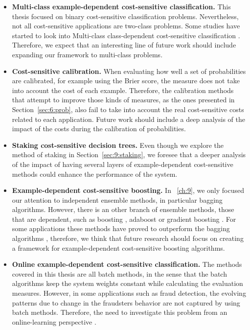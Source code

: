 \begin{itemize}
 \item \textbf{Multi-class example-dependent cost-sensitive classification.} This thesis  
focused on binary cost-sensitive classification problems. Nevertheless, not all 
 cost-sensitive applications are two-class problems. Some studies have started to 
look into Multi-class class-dependent cost-sensitive classification \citep{Zhou2010}. Therefore, we 
expect that an interesting line of future work should include expanding our framework to 
multi-class problems.

 \item \textbf{Cost-sensitive calibration.} When evaluating how well a set of probabilities are 
calibrated, for example using the Brier score, the measure does not take into account the cost of 
each example. Therefore, the calibration methods that attempt to improve those kinds of measures, as 
the ones presented in Section~\ref{sec:6:prob}, also fail to take into account the real 
cost-sensitive costs related to each application. Future work should include a deep analysis of the 
impact of the costs during the calibration of probabilities.

  \item \textbf{Staking cost-sensitive decision trees.} Even though we explore the method of 
staking in Section~\ref{sec:9:staking}, we foresee that a deeper analysis of the impact of having 
several layers of example-dependent cost-sensitive methods could enhance the performance of the 
system.

  \item \textbf{Example-dependent cost-sensitive boosting.} In \chaptername{~\ref{ch:9}}, we 
only focused our attention to independent ensemble methods, in particular bagging algorithms. 
However, there is an other branch of ensemble methods, those that are dependent, such as 
boosting \citep{Schapire1990}, adaboost \citep{Freund1996} or gradient boosting 
\citep{Friedman2001,Friedman2002}. For some applications these methods have proved to outperform 
the bagging algorithms \citep{Zhou2012}, therefore, we think that future research should focus on 
creating a framework for example-dependent cost-sensitive boosting algorithms.

  \item \textbf{Online example-dependent cost-sensitive classification.} The methods covered in 
this thesis are all batch methods, in the sense that the batch algorithms keep the system weights 
constant while calculating the evaluation measures. However, in some applications such as fraud 
detection, the evolving patterns due to change in the fraudsters behavior are not captured by using 
batch methods. Therefore, the need to investigate this problem from an online-learning perspective 
\citep{Pozzolo2014}. 

\end{itemize}

